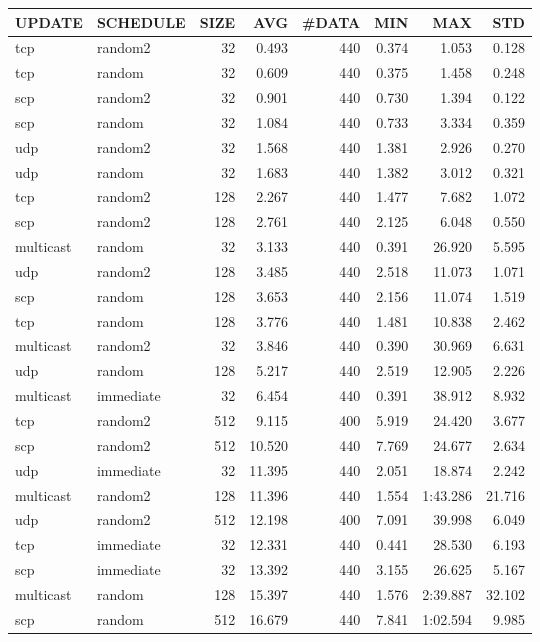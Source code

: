 \begin{tabular}{|l|l|r|r|r|r|r|r|}
\hline
UPDATE & SCHEDULE & SIZE & AVG & \#DATA & MIN & MAX & STD\\
\hline
tcp & random2 & 32 & 0.493 & 440 & 0.374 & 1.053 & 0.128\\
tcp & random & 32 & 0.609 & 440 & 0.375 & 1.458 & 0.248\\
scp & random2 & 32 & 0.901 & 440 & 0.730 & 1.394 & 0.122\\
scp & random & 32 & 1.084 & 440 & 0.733 & 3.334 & 0.359\\
udp & random2 & 32 & 1.568 & 440 & 1.381 & 2.926 & 0.270\\
udp & random & 32 & 1.683 & 440 & 1.382 & 3.012 & 0.321\\
tcp & random2 & 128 & 2.267 & 440 & 1.477 & 7.682 & 1.072\\
scp & random2 & 128 & 2.761 & 440 & 2.125 & 6.048 & 0.550\\
multicast & random & 32 & 3.133 & 440 & 0.391 & 26.920 & 5.595\\
udp & random2 & 128 & 3.485 & 440 & 2.518 & 11.073 & 1.071\\
scp & random & 128 & 3.653 & 440 & 2.156 & 11.074 & 1.519\\
tcp & random & 128 & 3.776 & 440 & 1.481 & 10.838 & 2.462\\
multicast & random2 & 32 & 3.846 & 440 & 0.390 & 30.969 & 6.631\\
udp & random & 128 & 5.217 & 440 & 2.519 & 12.905 & 2.226\\
multicast & immediate & 32 & 6.454 & 440 & 0.391 & 38.912 & 8.932\\
tcp & random2 & 512 & 9.115 & 400 & 5.919 & 24.420 & 3.677\\
scp & random2 & 512 & 10.520 & 440 & 7.769 & 24.677 & 2.634\\
udp & immediate & 32 & 11.395 & 440 & 2.051 & 18.874 & 2.242\\
multicast & random2 & 128 & 11.396 & 440 & 1.554 & 1:43.286 & 21.716\\
udp & random2 & 512 & 12.198 & 400 & 7.091 & 39.998 & 6.049\\
tcp & immediate & 32 & 12.331 & 440 & 0.441 & 28.530 & 6.193\\
scp & immediate & 32 & 13.392 & 440 & 3.155 & 26.625 & 5.167\\
multicast & random & 128 & 15.397 & 440 & 1.576 & 2:39.887 & 32.102\\
scp & random & 512 & 16.679 & 440 & 7.841 & 1:02.594 & 9.985\\

\end{tabular}
